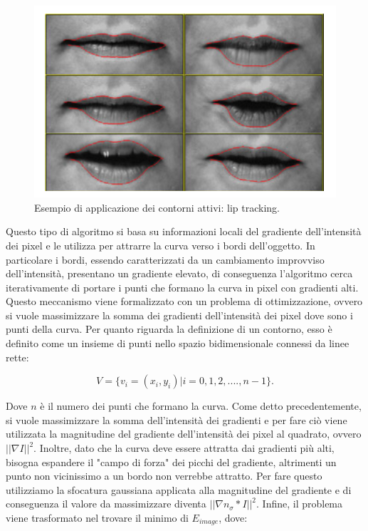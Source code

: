 \begin{figure}[h!]
    \centering
    \hspace*{-0in}
    \includegraphics[scale=0.6]{img/active-cont.png}
    \caption{Esempio di applicazione dei contorni attivi: lip tracking.}
    \label{fig:lip_track}
\end{figure}

Questo tipo di algoritmo si basa su informazioni locali del gradiente dell'intensità dei pixel e le utilizza per attrarre la curva verso i bordi dell'oggetto. In particolare i bordi, essendo caratterizzati da un cambiamento improvviso dell'intensità, presentano un gradiente elevato, di conseguenza l'algoritmo cerca iterativamente di portare i punti che formano la curva in pixel con gradienti alti.
Questo meccanismo viene formalizzato con un problema di ottimizzazione, ovvero si vuole massimizzare la somma dei gradienti dell'intensità dei pixel dove sono i punti della curva.
Per quanto riguarda la definizione di un contorno, esso è definito come un insieme di punti nello spazio bidimensionale connessi da linee rette:

\begin{equation}
    V = \{v_{i} = (x_{i}, y_{i}) | i = 0,1,2,...., n-1\}.
\end{equation}

Dove $n$ è il numero dei punti che formano la curva. Come detto precedentemente, si vuole massimizzare la somma dell'intensità dei gradienti e per fare ciò viene utilizzata la magnitudine del gradiente dell'intensità dei pixel al quadrato, ovvero $||\nabla I||^{2}$. Inoltre, dato che la curva deve essere attratta dai gradienti più alti, bisogna espandere il "campo di forza" dei picchi del gradiente, altrimenti un punto non vicinissimo a un bordo non verrebbe attratto. Per fare questo utilizziamo la sfocatura gaussiana applicata alla magnitudine del gradiente e di conseguenza il valore da massimizzare diventa $||\nabla n_{\sigma} \ast I||^{2}$. Infine, il problema viene trasformato nel trovare il minimo di $E_{image}$, dove:

